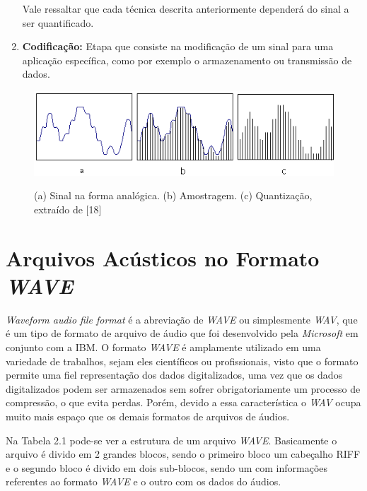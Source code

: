 \documentclass[a4paper,12pt,twoside,openright]{report}
\begin{document}
\begin{enumerate}
	\par  Vale ressaltar que cada t\'{e}cnica descrita anteriormente depender\'{a} do sinal a ser quantificado.
	
	\item{}	\textbf{Codifica{\c c}\~{a}o:} Etapa que consiste na modifica{\c c}\~{a}o de um sinal para uma aplica{\c c}\~{a}o espec\'{i}fica, como por exemplo o armazenamento ou transmiss\~{a}o de dados.
\end{enumerate}


\begin{figure}[h]
	\centering
	\caption{(a) Sinal na forma anal\'{o}gica. (b) Amostragem. (c) Quantiza{\c c}\~{a}o, extra\'{i}do de [18]}
	
	\centering %
	\includegraphics[width=13cm]{figuras/quant_amost.png} %
	\label{figura:quantizacao}
\end{figure}


\section{Arquivos Ac\'{u}sticos no Formato \textit{WAVE}}
\label{secao_formato wave}

\par\textit{Waveform audio file format} \'{e} a abrevia\c{c}\~{a}o de \textit{WAVE} ou simplesmente \textit{WAV}, que \'{e} um tipo de formato de arquivo de \'{a}udio que foi desenvolvido pela \textit{Microsoft} em conjunto com a IBM. O formato \textit{WAVE} \'{e} amplamente utilizado em uma variedade de trabalhos, sejam eles cient\'{i}ficos ou profissionais, visto que o formato permite uma fiel representa\c{c}\~{a}o dos dados digitalizados, uma vez que os dados digitalizados podem ser armazenados sem sofrer obrigatoriamente um processo de compress\~{a}o, o que evita perdas. Por\'{e}m, devido a essa caracter\'{i}stica o \textit{WAV} ocupa muito mais espa\c{c}o que os demais formatos de arquivos de \'{a}udios. 

\par Na Tabela 2.1 pode-se ver a estrutura de um arquivo \textit{WAVE}. Basicamente o arquivo \'{e} divido em 2 grandes blocos, sendo o primeiro bloco um cabe{\c c}alho RIFF e o segundo bloco \'{e} divido em dois sub-blocos, sendo um com informa{\c c}\~{o}es referentes ao formato \textit{WAVE} e o outro com os dados do \'{a}udios.
\end{document}
